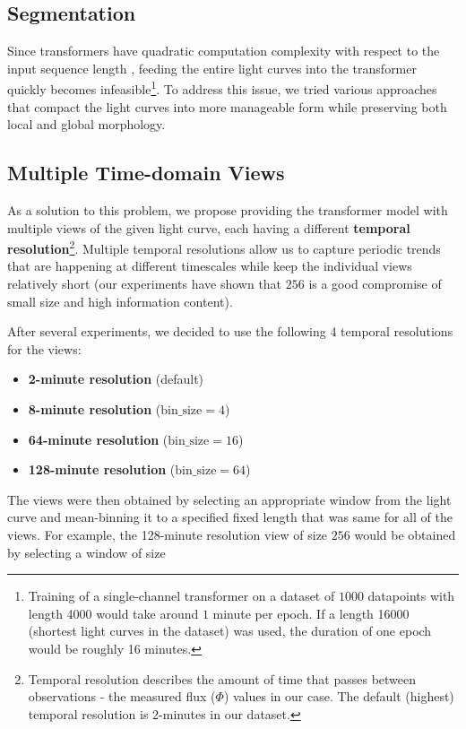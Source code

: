 \FloatBarrier

\subsection{Segmentation}

Since transformers have quadratic computation complexity with respect to the input sequence length \parencite{AttentionIsAllYouNeed}, feeding the entire light curves into the transformer quickly becomes infeasible\footnote{Training of a single-channel transformer on a dataset of $1000$ datapoints with length \num{4000} would take around $1$ minute per epoch. If a length \num{16000} (shortest light curves in the dataset) was used, the duration of one epoch would be roughly 16 minutes.}.
To address this issue, we tried various approaches that compact the light curves into more manageable form while preserving both local and global morphology.

\subsection{Multiple Time-domain Views}

As a solution to this problem, we propose providing the transformer model with multiple views of the given light curve, each having a different \textbf{temporal resolution}\footnote{Temporal resolution describes the amount of time that passes between observations - the measured flux ($\Phi$) values in our case. The default (highest) temporal resolution is 2-minutes in our dataset.}.
Multiple temporal resolutions allow us to capture periodic trends that are happening at different timescales while keep the individual views relatively short (our experiments have shown that $256$ is a good compromise of small size and high information content).

After several experiments, we decided to use the following 4 temporal resolutions for the views:

\begin{itemize}
    \item \textbf{2-minute resolution} (default)
    \item \textbf{8-minute resolution} ($\mathrm{bin\_size}=4$)
    \item \textbf{64-minute resolution} ($\mathrm{bin\_size}=16$)
    \item \textbf{128-minute resolution} ($\mathrm{bin\_size}=64$)
\end{itemize}

The views were then obtained by selecting an appropriate window from the light curve and mean-binning it to a specified fixed length that was same for all of the views.
For example, the 128-minute resolution view of size $256$ would be obtained by selecting a window of size

